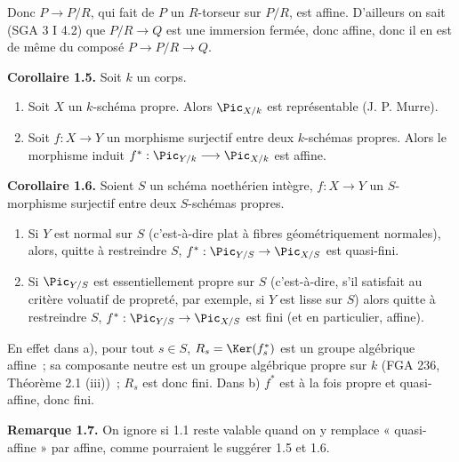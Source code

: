 Donc \(P\to P/R\), qui fait de \(P\) un \(R\)-torseur sur \(P/R\), est affine. D'ailleurs on sait (SGA 3 I 4.2) que \(P/R\to Q\) est une immersion fermée, donc affine, donc il en est de même du composé \(P\to P/R\to Q\).

\textbf{Corollaire 1.5.} Soit \(k\) un corps.
\begin{enumerate}[label=\alph*)]
\item Soit \(X\) un \(k\)-schéma propre. Alors \(\Pic_{X/k}\) est représentable (J. P. Murre).
\item Soit \(f:X\to Y\) un morphisme surjectif entre deux \(k\)-schémas propres. Alors le morphisme induit \(f^*:\Pic_{Y/k}\longrightarrow \Pic_{X/k}\) est affine.
\end{enumerate}

\textbf{Corollaire 1.6.} Soient \(S\) un schéma noethérien intègre, \(f:X\to Y\) un \(S\)-morphisme surjectif entre deux \(S\)-schémas propres.
\begin{enumerate}[label=\alph*)]
\item Si \(Y\) est normal sur \(S\) (c'est-à-dire plat à fibres géométriquement normales), alors, quitte à restreindre \(S\), \(f^*:\Pic_{Y/S}\to\Pic_{X/S}\) est quasi-fini.
\item Si \(\Pic_{Y/S}\) est essentiellement propre sur \(S\) (c'est-à-dire, s'il satisfait au critère voluatif de propreté, par exemple, si \(Y\) est lisse sur \(S\)) alors quitte à restreindre \(S\), \(f^*:\Pic_{Y/S}\to\Pic_{X/S}\) est fini (et en particulier, affine).
\end{enumerate}
En effet dans a), pour tout \(s\in S\), \(R_s=\Ker(f_s^*)\) est un groupe algébrique affine~; sa composante neutre est un groupe algébrique propre sur \(k\) (FGA 236, Théorème 2.1 (iii))~; \(R_s\) est donc fini. Dans b) \(f^*\) est à la fois propre et quasi-affine, donc fini.

\textbf{Remarque 1.7.} On ignore si 1.1 reste valable quand on y remplace « quasi-affine » par affine, comme pourraient le suggérer 1.5 et 1.6.

